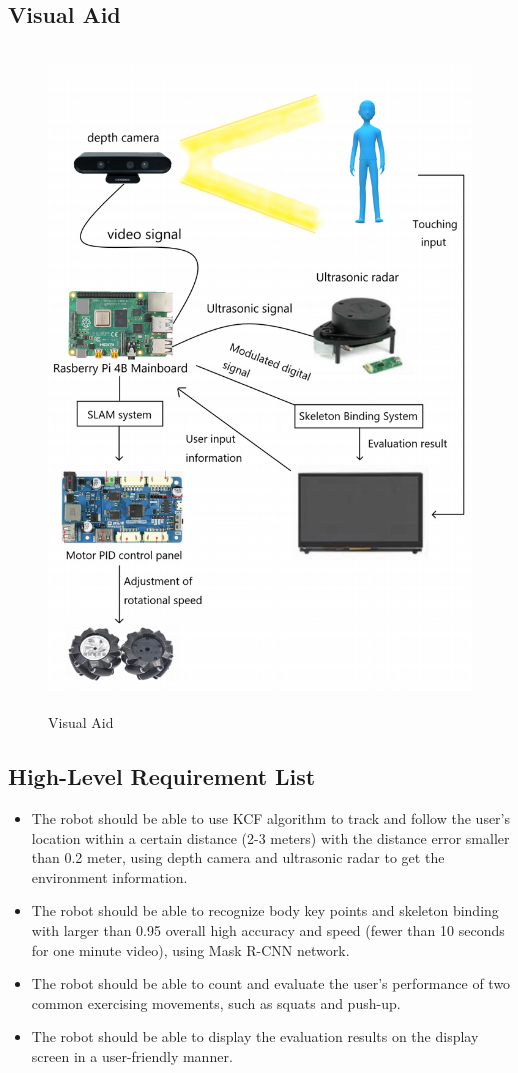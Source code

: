 \subsection{Visual Aid}
\begin{figure}[H]
    \centering
    \includegraphics[width=12cm, height=17.5cm]{sections/Visual.png}
    \caption{Visual Aid}
\end{figure}


\subsection{High-Level Requirement List}
\begin{itemize}
\item The robot should be able to use KCF algorithm to track and follow the user’s location within a certain distance (2-3 meters) with the distance error smaller than 0.2 meter, using depth camera and ultrasonic radar to get the environment information. 

\item The robot should be able to recognize body key points and skeleton binding with larger than 0.95 overall high accuracy and speed (fewer than 10 seconds for one minute video), using Mask R-CNN network. 

\item The robot should be able to count and evaluate the user’s performance of two common exercising movements, such as squats and push-up.

\item The robot should be able to display the evaluation results on the display screen in a user-friendly manner.
\end{itemize}